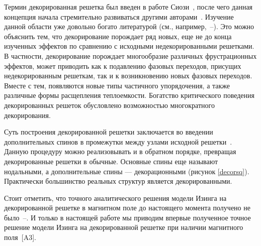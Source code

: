 Термин \guillemotleft декорированная решетка\guillemotright \hspace{1pt} был введен в работе Сиози~\cite{siozi1951}, после чего данная концепция начала стремительно развиваться другими авторами~\cite{siozi_domb1972, fisher1958}. Изучение данной области уже довольно богато литературой (см., например,~\cite{jaščur2016}--\cite{mutalamov2020}). Это можно объяснить тем, что декорирование порождает ряд новых, еще не до конца изученных эффектов по сравнению с исходными недекорированными решетками. В частности, декорирование порождает многообразие различных фрустрационных эффектов, может приводить как к подавлению фазовых переходов, присущих недекорированным решеткам, так и к возникновению новых фазовых переходов. Вместе с тем, появляются новые типы частичного упорядочения, а также различные формы расщепления теплоемкости. Богатство критического поведения декорированных решеток обусловлено возможностью многократного декорирования.

Суть построения декорированной решетки заключается во введении дополнительных спинов в промежутки между узлами исходной решетки~\cite{siozi_domb1972}. Данную процедуру можно реализовывать и в обратном порядке, превращая декорированные решетки в обычные. Основные спины еще называют нодальными, а дополнительные спины --- декорационными (рисунок \ref{decorsq}). Практически большинство реальных структур является декорированными.



Стоит отметить, что точного аналитического решения модели Изинга на декорированной решетке в магнитном поле до настоящего момента получено не было~\cite{kassan-ogly2019}--\cite{kassan-ogly2020}. И только в настоящей работе мы приводим впервые полученное точное решение модели Изинга на декорированной решетке при наличии магнитного поля~[A3].

